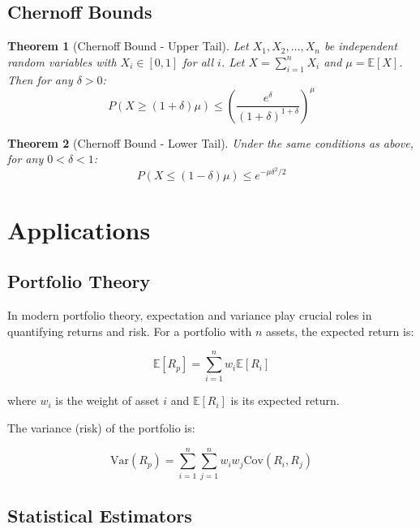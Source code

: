 \documentclass[12pt,a4paper]{article}
\theoremstyle{plain}
\newtheorem{theorem}{Theorem}[section]
\theoremstyle{definition}
\begin{document}
\subsection{Chernoff Bounds}

\begin{theorem}[Chernoff Bound - Upper Tail]
Let $X_1, X_2, \ldots, X_n$ be independent random variables with $X_i \in [0, 1]$ for all $i$. Let $X = \sum_{i=1}^{n} X_i$ and $\mu = \mathbb{E}[X]$. Then for any $\delta > 0$:
\begin{equation}
P(X \geq (1+\delta)\mu) \leq \left(\frac{e^\delta}{(1+\delta)^{1+\delta}}\right)^{\mu}
\end{equation}
\end{theorem}

\begin{theorem}[Chernoff Bound - Lower Tail]
Under the same conditions as above, for any $0 < \delta < 1$:
\begin{equation}
P(X \leq (1-\delta)\mu) \leq e^{-\mu\delta^2/2}
\end{equation}
\end{theorem}

\section{Applications}

\subsection{Portfolio Theory}

In modern portfolio theory, expectation and variance play crucial roles in quantifying returns and risk. For a portfolio with $n$ assets, the expected return is:

\begin{equation}
\mathbb{E}[R_p] = \sum_{i=1}^{n} w_i \mathbb{E}[R_i]
\end{equation}

where $w_i$ is the weight of asset $i$ and $\mathbb{E}[R_i]$ is its expected return.

The variance (risk) of the portfolio is:

\begin{equation}
\text{Var}(R_p) = \sum_{i=1}^{n}\sum_{j=1}^{n} w_i w_j \text{Cov}(R_i, R_j)
\end{equation}

\subsection{Statistical Estimators}
\end{document}
